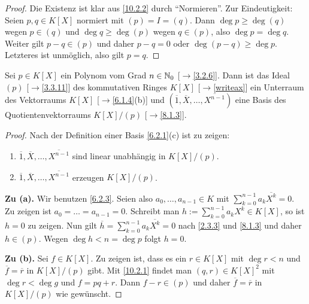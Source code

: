 \documentclass[../../main.tex]{subfiles}
\begin{document}
\begin{proof}
Die Existenz ist klar aus \ref{10.2.2} durch "`Normieren"'. Zur Eindeutigkeit: Seien $p,q\in K[X]$ normiert mit $(p)=I=(q)$. Dann $\deg p\ge\deg(q)$ wegen $p\in(q)$ und
$\deg q\ge\deg(p)$ wegen $q\in(p)$, also $\deg p=\deg q$. Weiter gilt $p-q\in(p)$ und daher $p-q=0$ oder $\deg(p-q)\ge\deg p$. Letzteres ist unmöglich, also gilt $p=q$.
\end{proof}


\begin{pro}\label{10.2.5}
Sei $p\in K[X]$ ein Polynom vom Grad $n\in\mathbb N_0$ {\rm[$\to$\ref{3.2.6}]}. Dann ist das Ideal $(p)$ {\rm[$\to$\ref{3.3.11}]} des kommutativen Ringes $K[X]$ {\rm[$\to$\ref{writeax}]} ein Unterraum des Vektorraums $K[X]$ {\rm[$\to$\ref{6.1.4}(b)]} und
$(\overline1,\overline X,\dots,\overline{X^{n-1}})$ eine Basis des Quotientenvektorraums $K[X]/(p)$ {\rm[$\to$\ref{8.1.3}]}.
\end{pro}

\begin{proof}
Nach der Definition einer Basis \ref{6.2.1}(c) ist zu zeigen:
\begin{enumerate}[\normalfont(a)]
\item $\overline1,\overline X,\dots,\overline{X^{n-1}}$ sind linear unabhängig in $K[X]/(p)$.
\item $\overline1,\overline X,\dots,\overline{X^{n-1}}$ erzeugen $K[X]/(p)$.
\end{enumerate}
\textbf{Zu (a).} Wir benutzen \ref{6.2.3}. Seien also $a_0,\dots,a_{n-1}\in K$ mit $\sum_{k=0}^{n-1}a_k\overline{X^k}=0$. Zu zeigen ist $a_0=\ldots=a_{n-1}=0$. Schreibt man
$h:=\sum_{k=0}^{n-1}a_kX^k\in K[X]$, so ist $h=0$ zu zeigen. Nun gilt $\overline h=\sum_{k=0}^{n-1}a_k\overline{X^k}=0$ nach \ref{2.3.3} und \ref{8.1.3} und daher $h\in(p)$.
Wegen $\deg h<n=\deg p$ folgt $h=0$.
 
\medskip\noindent
\textbf{Zu (b).} Sei $f\in K[X]$. Zu zeigen ist, dass es ein $r\in K[X]$ mit $\deg r<n$ und $\overline f=\overline r$ in $K[X]/(p)$ gibt. Mit \ref{10.2.1} findet man
$(q,r)\in K[X]^2$ mit $\deg r<\deg g$ und $f=pq+r$. Dann $f-r\in(p)$ und daher $\overline f=\overline r$ in $K[X]/(p)$ wie gewünscht.
\end{proof}
\end{document}
